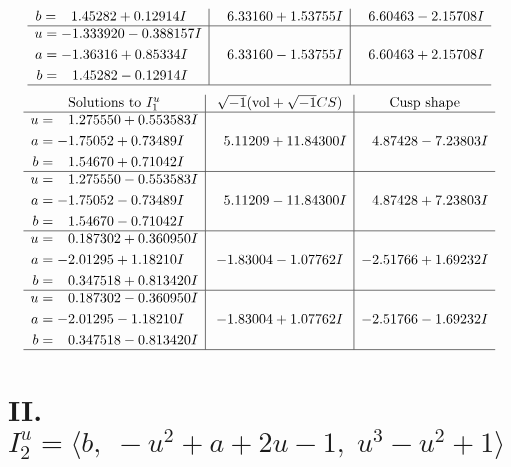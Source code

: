 \documentclass[1p]{elsarticle_modified}
\theoremstyle{definition}
\newcommand{\I}{\sqrt{-1}}
\begin{document}
$$\begin{array}{c|c|c}
\begin{aligned}
b &= \phantom{-}1.45282 + 0.12914 I\end{aligned}
 & \phantom{-}6.33160 + 1.53755 I & \phantom{-}6.60463 - 2.15708 I \\ \hline\begin{aligned}
u &= -1.333920 - 0.388157 I \\
a &= -1.36316 + 0.85334 I \\
b &= \phantom{-}1.45282 - 0.12914 I\end{aligned}
 & \phantom{-}6.33160 - 1.53755 I & \phantom{-}6.60463 + 2.15708 I\\
 \hline 
 \end{array}$$\newpage$$\begin{array}{c|c|c}  
\text{Solutions to }I^u_{1}& \I (\text{vol} + \sqrt{-1}CS) & \text{Cusp shape}\\
 \hline 
\begin{aligned}
u &= \phantom{-}1.275550 + 0.553583 I \\
a &= -1.75052 + 0.73489 I \\
b &= \phantom{-}1.54670 + 0.71042 I\end{aligned}
 & \phantom{-}5.11209 + 11.84300 I & \phantom{-}4.87428 - 7.23803 I \\ \hline\begin{aligned}
u &= \phantom{-}1.275550 - 0.553583 I \\
a &= -1.75052 - 0.73489 I \\
b &= \phantom{-}1.54670 - 0.71042 I\end{aligned}
 & \phantom{-}5.11209 - 11.84300 I & \phantom{-}4.87428 + 7.23803 I \\ \hline\begin{aligned}
u &= \phantom{-}0.187302 + 0.360950 I \\
a &= -2.01295 + 1.18210 I \\
b &= \phantom{-}0.347518 + 0.813420 I\end{aligned}
 & -1.83004 - 1.07762 I & -2.51766 + 1.69232 I \\ \hline\begin{aligned}
u &= \phantom{-}0.187302 - 0.360950 I \\
a &= -2.01295 - 1.18210 I \\
b &= \phantom{-}0.347518 - 0.813420 I\end{aligned}
 & -1.83004 + 1.07762 I & -2.51766 - 1.69232 I\\
 \hline 
 \end{array}$$\newpage\newpage\renewcommand{\arraystretch}{1}
\centering \section*{II. $I^u_{2}= \langle b,\;- u^2+a+2 u-1,\;u^3- u^2+1 \rangle$}
\end{document}
